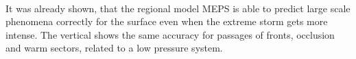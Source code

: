 \\
It was already shown, that the regional model MEPS is able to predict large scale phenomena correctly for the surface even when the extreme storm gets more intense. The vertical shows the same accuracy for passages of fronts, occlusion and warm sectors, related to a low pressure system.


